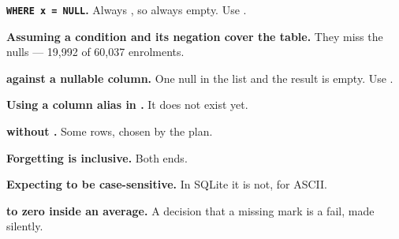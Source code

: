 \begin{pitfall}
\begin{tight}
  \item \textbf{\texttt{WHERE x = NULL}.} Always \unk{}, so always
        empty. Use .
  \item \textbf{Assuming a condition and its negation cover the table.} They
        miss the nulls --- 19{,}992 of 60{,}037 enrolments.
  \item \textbf{ against a nullable column.} One null in the
        list and the result is empty. Use .
  \item \textbf{Using a column alias in .} It does not exist yet.
  \item \textbf{ without .} Some rows, chosen by
        the plan.
  \item \textbf{Forgetting  is inclusive.} Both ends.
  \item \textbf{Expecting  to be case-sensitive.} In SQLite it is
        not, for ASCII.
  \item \textbf{ to zero inside an average.} A decision that a
        missing mark is a fail, made silently.
\end{tight}
\end{pitfall}

